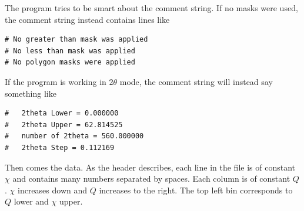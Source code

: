 The program tries to be smart about the comment string. If no 
masks were used, the comment string instead contains lines like
\begin{lstlisting}[caption={'Alternate Header'}]
# No greater than mask was applied
# No less than mask was applied
# No polygon masks were applied
\end{lstlisting}
If the program is working in $2\theta$ mode, the comment string will 
instead say something like
\begin{lstlisting}[caption={'Another Alternate Header'}]
#   2theta Lower = 0.000000
#   2theta Upper = 62.814525
#   number of 2theta = 560.000000
#   2theta Step = 0.112169
\end{lstlisting}


Then comes the data. As the header describes, each line in the
file is of constant $\chi$ and contains many numbers separated by
spaces. Each column is of constant $Q$. $\chi$ increases down and 
$Q$ increases to the right. The top left bin corresponds to
$Q$ lower and $\chi$ upper.
